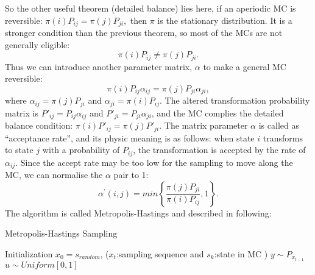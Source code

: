 \documentclass[11pt,twoside,a4paper]{article}
\begin{document}
	So the other useful theorem (detailed balance) lies here, if an aperiodic MC is reversible: $\pi (i) P_{ij} = \pi (j) P_{ji},$ then $ \pi $ is the stationary distribution.
	It is a stronger condition than the previous theorem, so most of the MCs are not generally eligible:
	\begin{equation}
	\pi (i) P_{ij} \neq \pi (j) P_{ji}.
	\end{equation}
	Thus we can introduce another parameter matrix, $ \alpha $ to make a general MC reversible:
	\begin{equation}
	\pi (i) P_{ij} \alpha_{ij} = \pi (j) P_{ji} \alpha_{ji}	,
	\end{equation}
	where $ \alpha_{ij} = \pi(j) P_{ji} $ and $ \alpha_{ji} = \pi(i) P_{ij}$.
	The altered transformation probability matrix is $ P'_{ij} =  P_{ij} \alpha_{ij}$ and $ P'_{ji} =  P_{ji} \alpha_{ji}$, and the MC complies the detailed balance condition: $\pi (i) P'_{ij} = \pi (j) P'_{ji}$.
	The matrix parameter $ \alpha $ is called as ``acceptance rate'', and its physic meaning is as follows: when state $ i $ transforms to state $ j $ with a probability of $ P_{ij} $, the transformation is accepted by the rate of $ \alpha_{ij} $.
	Since the accept rate may be too low for the sampling to move along the MC, we can normalise the $ \alpha $ pair to 1:
	\begin{equation}
		\alpha^{'}(i,j) = min \left\{\frac{\pi(j)P_{ji}}{\pi(i)P_{ij}},1\right\}.
	\end{equation}
	The algorithm is called Metropolis-Hastings and described in following:
	\begin{algorithm}[h]
	  \caption{Metropolis-Hastings Sampling}
	  \label{alg:mcmc}
	  \begin{algorithmic}
	  	
	    \State Initialization $x_0 = s_{random}$, ($ x_t $:sampling sequence and $s_{k}$:state in MC )
		    \State $y \sim P_{x_{t-1}}$ 
		    \State $ u \sim Uniform[0,1] $ 
				 
				\Else {}  
			\EndIf
		\EndFor
	  \end{algorithmic}
	\end{algorithm}
\end{document}
